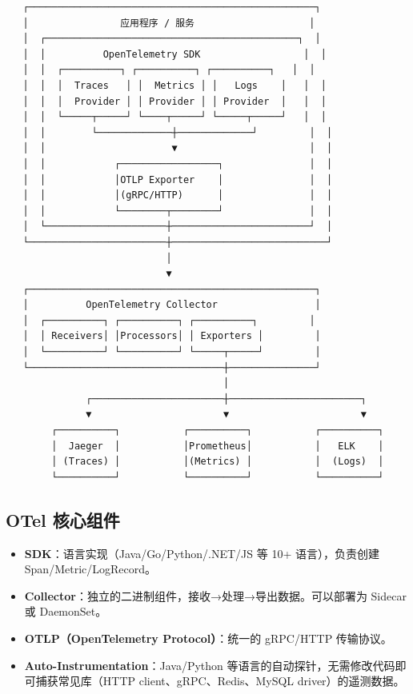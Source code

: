 \documentclass[12pt,UTF8]{ctexbook}
\begin{document}
\begin{lstlisting}
   ┌──────────────────────────────────────────────────┐
   │                应用程序 / 服务                    │
   │  ┌────────────────────────────────────────────┐  │
   │  │          OpenTelemetry SDK                  │  │
   │  │  ┌──────────┐ ┌──────────┐ ┌──────────┐   │  │
   │  │  │  Traces   │ │  Metrics │ │   Logs    │   │  │
   │  │  │  Provider │ │ Provider │ │ Provider  │   │  │
   │  │  └─────┬─────┘ └────┬─────┘ └─────┬─────┘   │  │
   │  │        └─────────────┼─────────────┘         │  │
   │  │                      ▼                       │  │
   │  │            ┌─────────────────┐               │  │
   │  │            │OTLP Exporter    │               │  │
   │  │            │(gRPC/HTTP)      │               │  │
   │  │            └────────┬────────┘               │  │
   │  └─────────────────────┼────────────────────────┘  │
   └────────────────────────┼───────────────────────────┘
                            │
                            ▼
   ┌──────────────────────────────────────────────────┐
   │          OpenTelemetry Collector                 │
   │  ┌──────────┐ ┌──────────┐ ┌──────────┐         │
   │  │ Receivers│ │Processors│ │ Exporters │         │
   │  └──────────┘ └──────────┘ └─────┬─────┘         │
   └──────────────────────────────────┼───────────────┘
                                      │
              ┌───────────────────────┼───────────────────────┐
              ▼                       ▼                       ▼
        ┌──────────┐           ┌──────────┐           ┌──────────┐
        │  Jaeger  │           │Prometheus│           │   ELK    │
        │ (Traces) │           │(Metrics) │           │  (Logs)  │
        └──────────┘           └──────────┘           └──────────┘
\end{lstlisting}

\subsection*{OTel 核心组件}

\begin{itemize}
    \item \textbf{SDK}：语言实现（Java/Go/Python/.NET/JS 等 10+ 语言），负责创建 Span/Metric/LogRecord。
    \item \textbf{Collector}：独立的二进制组件，接收→处理→导出数据。可以部署为 Sidecar 或 DaemonSet。
    \item \textbf{OTLP（OpenTelemetry Protocol）}：统一的 gRPC/HTTP 传输协议。
    \item \textbf{Auto-Instrumentation}：Java/Python 等语言的自动探针，无需修改代码即可捕获常见库（HTTP client、gRPC、Redis、MySQL driver）的遥测数据。
\end{itemize}
\end{document}
